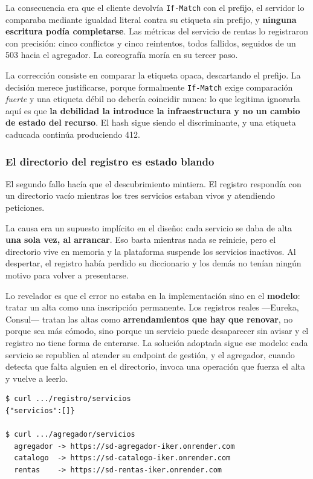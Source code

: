\documentclass[12pt]{article}
\begin{document}
La consecuencia era que el cliente devolvía \texttt{If-Match} con el prefijo, el servidor lo comparaba mediante igualdad literal contra su etiqueta sin prefijo, y \textbf{ninguna escritura podía completarse}. Las métricas del servicio de rentas lo registraron con precisión: cinco conflictos y cinco reintentos, todos fallidos, seguidos de un 503 hacia el agregador. La coreografía moría en su tercer paso.

La corrección consiste en comparar la etiqueta opaca, descartando el prefijo. La decisión merece justificarse, porque formalmente \texttt{If-Match} exige comparación \textit{fuerte} y una etiqueta débil no debería coincidir nunca: lo que legitima ignorarla aquí es que \textbf{la debilidad la introduce la infraestructura y no un cambio de estado del recurso}. El hash sigue siendo el discriminante, y una etiqueta caducada continúa produciendo 412.

\subsubsection*{El directorio del registro es estado blando}

El segundo fallo hacía que el descubrimiento mintiera. El registro respondía con un directorio vacío mientras los tres servicios estaban vivos y atendiendo peticiones.

La causa era un supuesto implícito en el diseño: cada servicio se daba de alta \textbf{una sola vez, al arrancar}. Eso basta mientras nada se reinicie, pero el directorio vive en memoria y la plataforma suspende los servicios inactivos. Al despertar, el registro había perdido su diccionario y los demás no tenían ningún motivo para volver a presentarse.

Lo revelador es que el error no estaba en la implementación sino en el \textbf{modelo}: tratar un alta como una inscripción permanente. Los registros reales —Eureka, Consul— tratan las altas como \textbf{arrendamientos que hay que renovar}, no porque sea más cómodo, sino porque un servicio puede desaparecer sin avisar y el registro no tiene forma de enterarse. La solución adoptada sigue ese modelo: cada servicio se republica al atender su endpoint de gestión, y el agregador, cuando detecta que falta alguien en el directorio, invoca una operación que fuerza el alta y vuelve a leerlo.

\begin{lstlisting}[style=traza,caption={El directorio se repara solo, verificado contra el despliegue}]
$ curl .../registro/servicios
{"servicios":[]}

$ curl .../agregador/servicios
  agregador -> https://sd-agregador-iker.onrender.com
  catalogo  -> https://sd-catalogo-iker.onrender.com
  rentas    -> https://sd-rentas-iker.onrender.com
\end{lstlisting}
\end{document}
